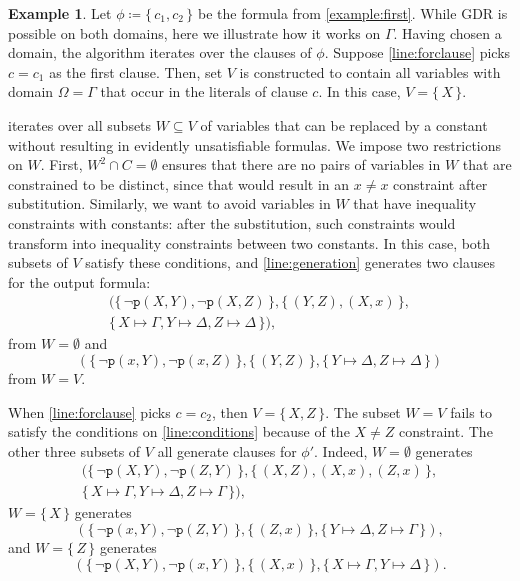 \documentclass{article}
\theoremstyle{definition}
\newtheorem{example}{Example}
\begin{document}
\begin{example}
  Let $\phi \coloneqq \{\, c_1, c_2 \,\}$ be the formula from
  \cref{example:first}. While GDR is possible on both domains, here we
  illustrate how it works on $\Gamma$. Having chosen a domain, the algorithm
  iterates over the clauses of $\phi$. Suppose \cref{line:forclause} picks
  $c = c_1$ as the first clause. Then, set $V$ is constructed to contain all
  variables with domain $\Omega = \Gamma$ that occur in the literals of clause
  $c$. In this case, $V = \{\, X \,\}$.

   iterates over all subsets $W \subseteq V$ of variables
  that can be replaced by a constant without resulting in evidently
  unsatisfiable formulas. We impose two restrictions on $W$. First,
  $W^2 \cap C = \emptyset$ ensures that there are no pairs of variables in $W$
  that are constrained to be distinct, since that would result in an $x \ne x$
  constraint after substitution. Similarly, we want to avoid variables in $W$
  that have inequality constraints with constants: after the substitution, such
  constraints would transform into inequality constraints between two constants.
  In this case, both subsets of $V$ satisfy these conditions, and
  \cref{line:generation} generates two clauses for the output formula:
  \begin{multline*}
    (\{\, \neg \texttt{p}(X, Y), \neg \texttt{p}(X, Z) \,\}, \{\, (Y, Z), (X, x) \,\}, \\
    \{\, X \mapsto \Gamma, Y \mapsto \Delta, Z \mapsto \Delta \,\}),
  \end{multline*}
  from $W = \emptyset$ and
  \[
    (\{\, \neg \texttt{p}(x, Y), \neg \texttt{p}(x, Z) \,\}, \{\, (Y, Z) \,\}, \{\, Y \mapsto \Delta, Z \mapsto \Delta \,\})
  \]
  from $W = V$.

  When \cref{line:forclause} picks $c = c_2$, then $V = \{\, X, Z \,\}$. The
  subset $W = V$ fails to satisfy the conditions on \cref{line:conditions}
  because of the $X \ne Z$ constraint. The other three subsets of $V$ all
  generate clauses for $\phi'$. Indeed, $W = \emptyset$ generates
  \begin{multline*}
    (\{\, \neg \texttt{p}(X, Y), \neg \texttt{p}(Z, Y) \,\}, \{\, (X, Z), (X, x), (Z, x) \,\}, \\
    \{\, X \mapsto \Gamma, Y \mapsto \Delta, Z \mapsto \Gamma \,\}),
  \end{multline*}
  $W = \{\, X \,\}$ generates
  \[
    (\{\, \neg \texttt{p}(x, Y), \neg \texttt{p}(Z, Y) \,\}, \{\, (Z, x) \,\}, \{\, Y \mapsto \Delta, Z \mapsto \Gamma \,\}),
  \]
  and $W = \{\, Z \,\}$ generates
  \[
    (\{\, \neg \texttt{p}(X, Y), \neg \texttt{p}(x, Y) \,\}, \{\, (X, x) \,\}, \{\, X \mapsto \Gamma, Y \mapsto \Delta \,\}).
  \]
\end{example}
\end{document}
